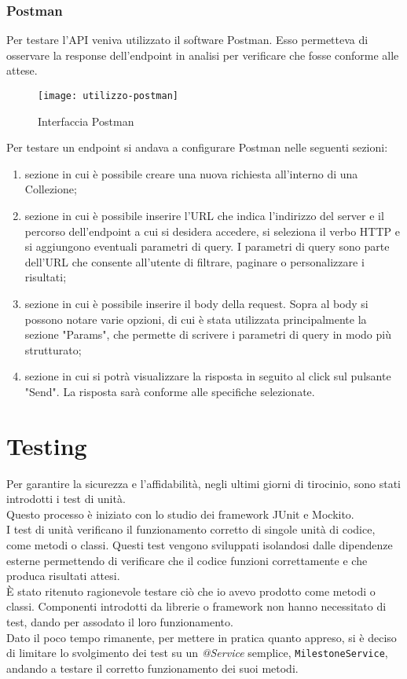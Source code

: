\subsubsection{Postman}
Per testare l'API veniva utilizzato il software Postman. Esso permetteva di osservare la response dell'endpoint in analisi per verificare che fosse conforme alle attese.\\

\begin{figure}[H] 
    \centering 
    \texttt{[image: utilizzo-postman]} 
    \caption{Interfaccia Postman}
\end{figure}
\noindent Per testare un endpoint si andava a configurare Postman nelle seguenti sezioni:
\begin{enumerate}
\item sezione in cui è possibile creare una nuova richiesta all'interno di una Collezione;
\item sezione in cui è possibile inserire l'URL che indica l'indirizzo del server e il percorso dell'endpoint a cui si desidera accedere, si seleziona il verbo HTTP e si aggiungono eventuali parametri di query. I parametri di query sono parte dell'URL che consente all'utente di filtrare, paginare o personalizzare i risultati;
\item sezione in cui è possibile inserire il body della request. Sopra al body si possono notare varie opzioni, di cui è stata utilizzata principalmente la sezione "Params", che permette di scrivere i parametri di query in modo più strutturato;
\item sezione in cui si potrà visualizzare la risposta in seguito al click sul pulsante "Send". La risposta sarà conforme alle specifiche selezionate.
\end{enumerate}

\hypertarget{testing}{\section{Testing}}
Per garantire la sicurezza e l’affidabilità, negli ultimi giorni di tirocinio, sono stati introdotti i test di unità.\\
Questo processo è iniziato con lo studio dei framework JUnit e Mockito.\\
I test di unità verificano il funzionamento corretto di singole unità di codice, come metodi o classi. Questi test vengono sviluppati isolandosi dalle dipendenze esterne permettendo di verificare che il codice funzioni correttamente e che produca risultati attesi.\\
È stato ritenuto ragionevole testare ciò che io avevo prodotto come metodi o classi. Componenti introdotti da librerie o framework non hanno necessitato di test, dando per assodato il loro funzionamento.\\
Dato il poco tempo rimanente, per mettere in pratica quanto appreso, si è deciso di limitare lo svolgimento dei test su un \textit{@Service} semplice, \texttt{MilestoneService}, andando a testare il corretto funzionamento dei suoi metodi.


